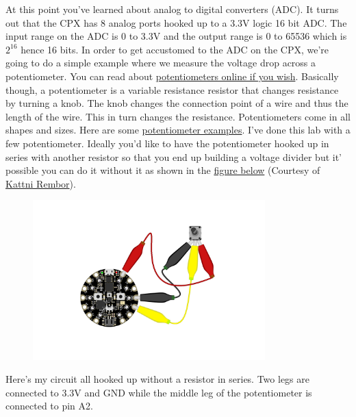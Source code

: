 At this point you've learned about analog to digital converters (ADC). It turns out that the CPX has 8 analog ports hooked up to a 3.3V logic 16 bit ADC. The input range on the ADC is 0 to 3.3V and the output range is 0 to 65536 which is $2^{16}$ hence 16 bits. In order to get accustomed to the ADC on the CPX, we’re going to do a simple example where we measure the voltage drop across a potentiometer. You can read about \href{https://www.build-electronic-circuits.com/potentiometer/}{potentiometers online if you wish}. Basically though, a potentiometer is a variable resistance resistor that changes resistance by turning a knob. The knob changes the connection point of a wire and thus the length of the wire. This in turn changes the resistance. Potentiometers come in all shapes and sizes. Here are some \href{https://uk.rs-online.com/web/content/discovery/ideas-and-advice/potentiometers-guide}{potentiometer examples}. I've done this lab with a few potentiometer. Ideally you'd like to have the potentiometer hooked up in series with another resistor so that you end up building a voltage divider but it' possible you can do it without it as shown in the \href{https://learn.adafruit.com/sensor-plotting-with-mu-and-circuitpython/potentiometer}{figure below} (Courtesy of \href{https://learn.adafruit.com/u/kattni}{Kattni Rembor}).
\begin{figure}[H]
  \begin{center}
    \includegraphics[width=0.8\textwidth]{Figures/sensors_PlottingMuPotentiometer_bb.jpg}
  \end{center}
\end{figure}
Here’s my circuit all hooked up without a resistor in series. Two legs are connected to 3.3V and GND while the middle leg of the potentiometer is connected to pin A2.
